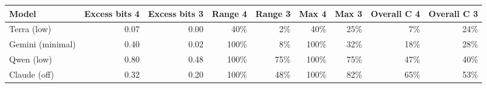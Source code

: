 \begin{adjustbox}{max width=\linewidth}
\begin{tabular}{@{}lrrrrrrrr@{}}
\toprule
Model & Excess bits 4 & Excess bits 3 & Range 4 & Range 3 & Max 4 & Max 3 & Overall C 4 & Overall C 3 \\
\midrule
Terra (low) & 0.07 & 0.00 & 40\% & 2\% & 40\% & 25\% & 7\% & 24\% \\
Gemini (minimal) & 0.40 & 0.02 & 100\% & 8\% & 100\% & 32\% & 18\% & 28\% \\
Qwen (low) & 0.80 & 0.48 & 100\% & 75\% & 100\% & 75\% & 47\% & 40\% \\
Claude (off) & 0.32 & 0.20 & 100\% & 48\% & 100\% & 82\% & 65\% & 53\% \\
\bottomrule
\end{tabular}
\end{adjustbox}

\par{}
